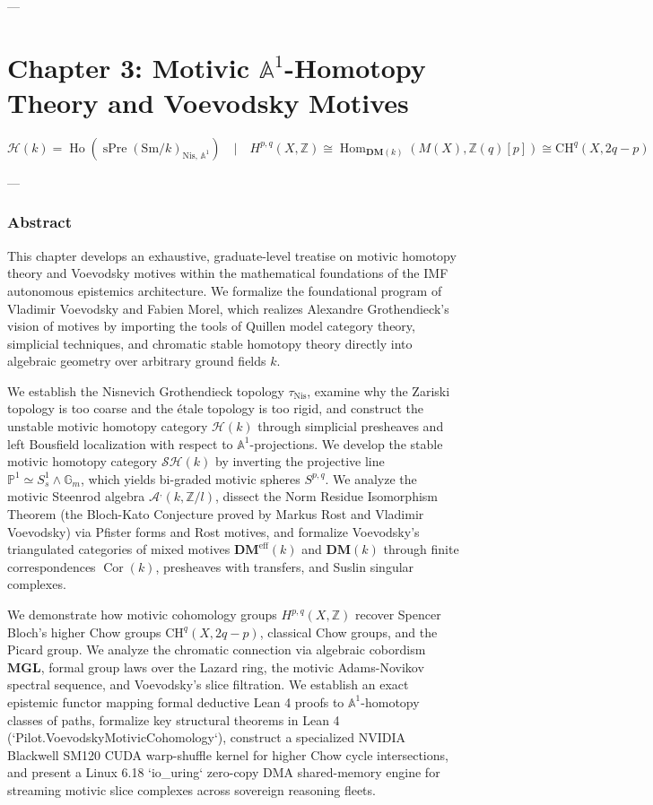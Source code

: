 \documentclass[11pt,twoside,openright]{amsbook}
\begin{document}
{---

\chapter{Chapter 3: Motivic $\mathbb{A}^1$-Homotopy Theory and Voevodsky Motives}

$$\mathcal{H}(k) = \operatorname{Ho}\left(\operatorname{sPre}(\mathrm{Sm}/k)_{\mathrm{Nis},\, \mathbb{A}^1}\right) \quad \vert \quad H^{p, q}(X, \mathbb{Z}) \cong \operatorname{Hom}_{\mathbf{DM}(k)}(M(X), \mathbb{Z}(q)[p]) \cong \mathrm{CH}^q(X, 2q - p)$$

---

\subsection{Abstract}
This chapter develops an exhaustive, graduate-level treatise on motivic homotopy theory and Voevodsky motives within the mathematical foundations of the IMF autonomous epistemics architecture. We formalize the foundational program of Vladimir Voevodsky and Fabien Morel, which realizes Alexandre Grothendieck's vision of motives by importing the tools of Quillen model category theory, simplicial techniques, and chromatic stable homotopy theory directly into algebraic geometry over arbitrary ground fields $k$. 

We establish the Nisnevich Grothendieck topology $\tau_{\mathrm{Nis}}$, examine why the Zariski topology is too coarse and the étale topology is too rigid, and construct the unstable motivic homotopy category $\mathcal{H}(k)$ through simplicial presheaves and left Bousfield localization with respect to $\mathbb{A}^1$-projections. We develop the stable motivic homotopy category $\mathcal{SH}(k)$ by inverting the projective line $\mathbb{P}^1 \simeq S^1_s \wedge \mathbb{G}_m$, which yields bi-graded motivic spheres $S^{p, q}$. We analyze the motivic Steenrod algebra $\mathcal{A}^{\textit{,}}(k, \mathbb{Z}/l)$, dissect the Norm Residue Isomorphism Theorem (the Bloch-Kato Conjecture proved by Markus Rost and Vladimir Voevodsky) via Pfister forms and Rost motives, and formalize Voevodsky's triangulated categories of mixed motives $\mathbf{DM}^{\mathrm{eff}}(k)$ and $\mathbf{DM}(k)$ through finite correspondences $\operatorname{Cor}(k)$, presheaves with transfers, and Suslin singular complexes.

We demonstrate how motivic cohomology groups $H^{p, q}(X, \mathbb{Z})$ recover Spencer Bloch's higher Chow groups $\mathrm{CH}^q(X, 2q - p)$, classical Chow groups, and the Picard group. We analyze the chromatic connection via algebraic cobordism $\mathbf{MGL}$, formal group laws over the Lazard ring, the motivic Adams-Novikov spectral sequence, and Voevodsky's slice filtration. We establish an exact epistemic functor mapping formal deductive Lean 4 proofs to $\mathbb{A}^1$-homotopy classes of paths, formalize key structural theorems in Lean 4 (`Pilot.VoevodskyMotivicCohomology`), construct a specialized NVIDIA Blackwell SM120 CUDA warp-shuffle kernel for higher Chow cycle intersections, and present a Linux 6.18 `io_uring` zero-copy DMA shared-memory engine for streaming motivic slice complexes across sovereign reasoning fleets.

}
\end{document}
